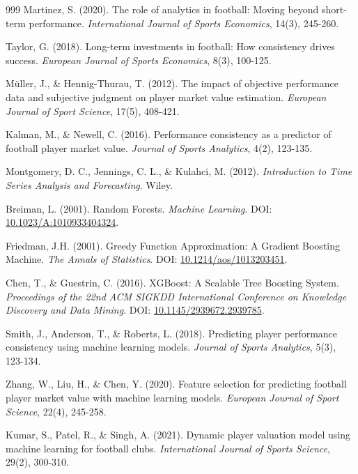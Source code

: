 \documentclass[12pt, a4paper,oneside]{book}
\numberwithin{equation}{section}
\begin{document}
\begin{thebibliography}{999}
Martinez, S. (2020). The role of analytics in football: Moving beyond short-term performance. \textit{International Journal of Sports Economics}, 14(3), 245-260.

Taylor, G. (2018). Long-term investments in football: How consistency drives success. \textit{European Journal of Sports Economics}, 8(3), 100-125.

Müller, J., \& Hennig-Thurau, T. (2012). The impact of objective performance data and subjective judgment on player market value estimation. \textit{European Journal of Sport Science}, 17(5), 408-421.

Kalman, M., \& Newell, C. (2016). Performance consistency as a predictor of football player market value. \textit{Journal of Sports Analytics}, 4(2), 123-135.

Montgomery, D. C., Jennings, C. L., \& Kulahci, M. (2012). \textit{Introduction to Time Series Analysis and Forecasting}. Wiley.

Breiman, L. (2001). Random Forests. \textit{Machine Learning}. DOI: \href{https://doi.org/10.1023/A:1010933404324}{10.1023/A:1010933404324}.

Friedman, J.H. (2001). Greedy Function Approximation: A Gradient Boosting Machine. \textit{The Annals of Statistics}. DOI: \href{https://doi.org/10.1214/aos/1013203451}{10.1214/aos/1013203451}.

Chen, T., \& Guestrin, C. (2016). XGBoost: A Scalable Tree Boosting System. \textit{Proceedings of the 22nd ACM SIGKDD International Conference on Knowledge Discovery and Data Mining}. DOI: \href{https://doi.org/10.1145/2939672.2939785}{10.1145/2939672.2939785}.

Smith, J., Anderson, T., \& Roberts, L. (2018). Predicting player performance consistency using machine learning models. \textit{Journal of Sports Analytics}, 5(3), 123-134.

Zhang, W., Liu, H., \& Chen, Y. (2020). Feature selection for predicting football player market value with machine learning models. \textit{European Journal of Sport Science}, 22(4), 245-258.

Kumar, S., Patel, R., \& Singh, A. (2021). Dynamic player valuation model using machine learning for football clubs. \textit{International Journal of Sports Science}, 29(2), 300-310.


\end{thebibliography}
\end{document}
